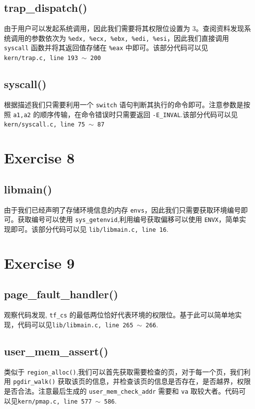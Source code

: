 \documentclass[11pt]{article}
\begin{document}
		\subsection*{trap\_dispatch()}
			由于用户可以发起系统调用，因此我们需要将其权限位设置为 $3$。查阅资料发现系统调用的参数依次为 \texttt{\%edx, \%ecx, \%ebx, \%edi, \%esi}，因此我们直接调用 \texttt{syscall} 函数并将其返回值存储在 \texttt{\%eax} 中即可。该部分代码可以见 \texttt{kern/trap.c, line 193 $\sim$ 200}
		
		\subsection*{syscall()}
		根据描述我们只需要利用一个 \texttt{switch} 语句判断其执行的命令即可。注意参数是按照 \texttt{a1,a2} 的顺序传输，在命令错误时只需要返回 \texttt{-E\_INVAL}.该部分代码可以见 \texttt{kern/syscall.c, line 75 $\sim$ 87}
		
	\section{Exercise 8}
		
		\subsection*{libmain()} 
		由于我们已经声明了存储环境信息的内存 \texttt{envs}，因此我们只需要获取环境编号即可。获取编号可以使用 \texttt{sys\_getenvid},利用编号获取偏移可以使用 \texttt{ENVX}，简单实现即可。该部分代码可以见 \texttt{lib/libmain.c, line 16}.
		
	\section{Exercise 9}
	
	\subsection*{page\_fault\_handler()} 
		观察代码发现, \texttt{tf\_cs} 的最低两位恰好代表环境的权限位。基于此可以简单地实现，代码可以见\texttt{lib/libmain.c, line 265 $\sim$ 266}.
		
	\subsection*{user\_mem\_assert()} 
		类似于 \texttt{region\_alloc()},我们可以首先获取需要检查的页，对于每一个页，我们利用 \texttt{pgdir\_walk()} 获取该页的信息，并检查该页的信息是否存在，是否越界，权限是否合法。注意最后生成的 \texttt{user\_mem\_check\_addr} 需要和 \texttt{va} 取较大者。代码可以见\texttt{kern/pmap.c, line 577 $\sim$ 586}.
		
\end{document}
